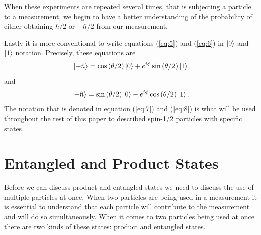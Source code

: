 \documentclass[twocolumn]{article}
\begin{document}
When these experiments are repeated several times, that is subjecting a particle to a measurement, we begin to have a better understanding of the probability of either obtaining $\hbar/2$ or $-\hbar/2$ from our measurement.

Lastly it is more conventional to write equations (\ref{eq:5}) and (\ref{eq:6}) in $\ket{0}$ and $\ket{1}$ notation. Precisely, these equations are
\begin{equation} \label{eq:7}
\ket{+\hat{n}}=\cos{(\theta/2)}\ket{0}+e^{i\phi}\sin{(\theta/2)}\ket{1}
\end{equation}
and
\begin{equation} \label{eq:8}
\ket{-\hat{n}}=\sin{(\theta/2)}\ket{0}-e^{i\phi}\cos{(\theta/2)}\ket{1}.
\end{equation}
The notation that is denoted in equation (\ref{eq:7}) and (\ref{eq:8}) is what will be used throughout the rest of this paper to described spin-1/2 particles with specific states.
\section*{Entangled and Product States}
Before we can discuss product and entangled states we need to discuss the use of multiple particles at once. When two particles are being used in a measurement it is essential to understand that each particle will contribute to the measurement and will do so simultaneously. When it comes to two particles being used at once there are two kinds of these states: product and entangled states.
\end{document}
